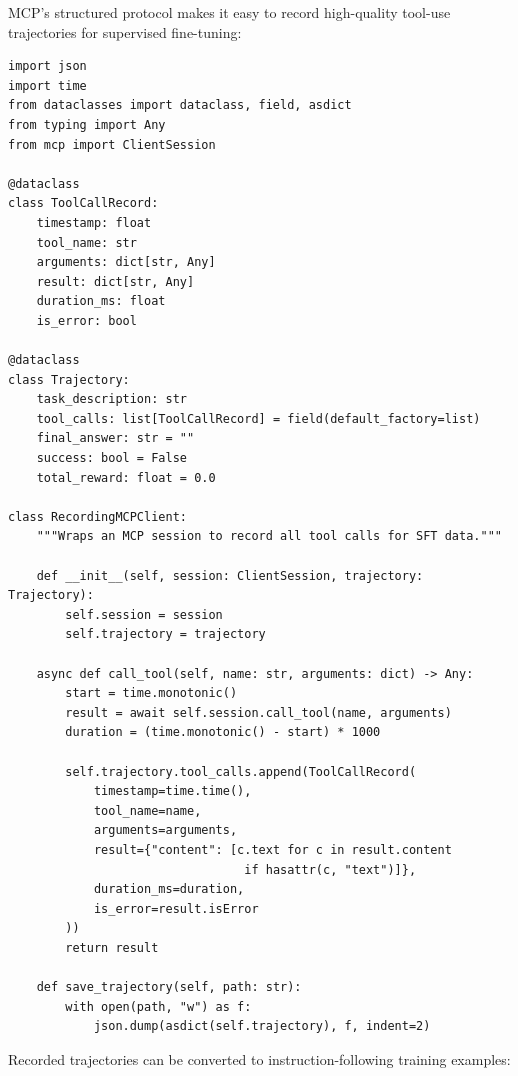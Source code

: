 MCP’s structured protocol makes it easy to record high-quality tool-use trajectories for supervised fine-tuning:

\begin{lstlisting}[style=pythonstyle, caption={Trajectory Recording Middleware for SFT Data Collection}]
import json
import time
from dataclasses import dataclass, field, asdict
from typing import Any
from mcp import ClientSession

@dataclass
class ToolCallRecord:
    timestamp: float
    tool_name: str
    arguments: dict[str, Any]
    result: dict[str, Any]
    duration_ms: float
    is_error: bool

@dataclass
class Trajectory:
    task_description: str
    tool_calls: list[ToolCallRecord] = field(default_factory=list)
    final_answer: str = ""
    success: bool = False
    total_reward: float = 0.0

class RecordingMCPClient:
    """Wraps an MCP session to record all tool calls for SFT data."""

    def __init__(self, session: ClientSession, trajectory: Trajectory):
        self.session = session
        self.trajectory = trajectory

    async def call_tool(self, name: str, arguments: dict) -> Any:
        start = time.monotonic()
        result = await self.session.call_tool(name, arguments)
        duration = (time.monotonic() - start) * 1000

        self.trajectory.tool_calls.append(ToolCallRecord(
            timestamp=time.time(),
            tool_name=name,
            arguments=arguments,
            result={"content": [c.text for c in result.content
                                 if hasattr(c, "text")]},
            duration_ms=duration,
            is_error=result.isError
        ))
        return result

    def save_trajectory(self, path: str):
        with open(path, "w") as f:
            json.dump(asdict(self.trajectory), f, indent=2)
\end{lstlisting}

Recorded trajectories can be converted to instruction-following training examples:

